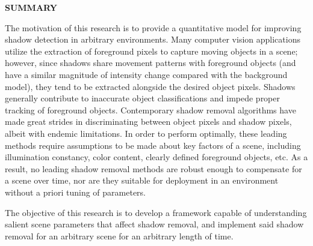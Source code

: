 \documentclass[12pt]{report}
\begin{document}
\clearpage
\begin{centering}
\textbf{SUMMARY}\\
\vspace{\baselineskip}
\end{centering}

\doublespacing

The motivation of this research is to provide a quantitative model for improving shadow detection in arbitrary environments. Many computer vision applications utilize the extraction of foreground pixels to capture moving objects in a scene; however, since shadows share movement patterns with foreground objects (and have a similar magnitude of intensity change compared with the background model), they tend to be extracted alongside the desired object pixels. Shadows generally contribute to inaccurate object classifications and impede proper tracking of foreground objects. Contemporary shadow removal algorithms have made great strides in discriminating between object pixels and shadow pixels, albeit with endemic limitations. In order to perform optimally, these leading methods require assumptions to be made about key factors of a scene, including illumination constancy, color content, clearly defined foreground objects, etc. As a result, no leading shadow removal methods are robust enough to compensate for a scene over time, nor are they suitable for deployment in an environment without a priori tuning of parameters. 
	
The objective of this research is to develop a framework capable of understanding salient scene parameters that affect shadow removal, and implement said shadow removal for an arbitrary scene for an arbitrary length of time.

\end{document}
